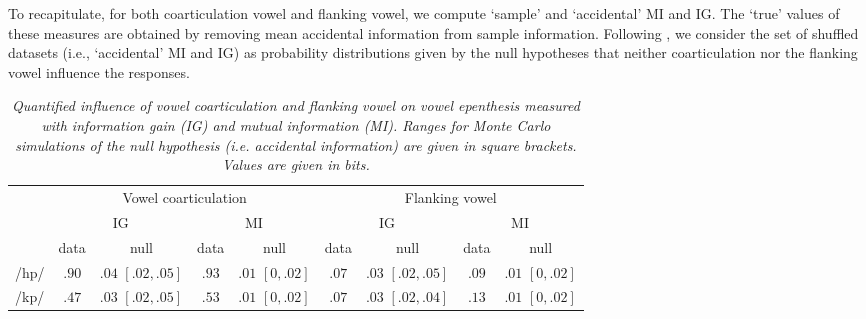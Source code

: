 To recapitulate, for both coarticulation vowel and flanking vowel, we compute `sample' and `accidental' MI and IG. The `true' values of these measures are obtained by removing mean accidental information from sample information. Following \cite{daland2015}, we consider the set of shuffled datasets (i.e., `accidental' MI and IG) as probability distributions given by the null hypotheses that neither coarticulation nor the flanking vowel influence the responses. 

\begin{table}[h!]
\setlength{\tabcolsep}{2pt}
\centering
    \begin{threeparttable}
    \caption{\textit{Quantified influence of vowel coarticulation and flanking vowel on vowel epenthesis measured with information gain (IG) and mutual information (MI). Ranges for Monte Carlo simulations of the null hypothesis (i.e. accidental information) are given in square brackets. Values are given in bits.}} 
    
    \label{infoth}
    \begin{tabular}{lcccccccc}
        \toprule
             & \multicolumn{4}{c}{Vowel coarticulation} & \multicolumn{4}{c}{Flanking vowel} \\ [0.5ex]
             & \multicolumn{2}{c}{IG} & \multicolumn{2}{c}{MI} & \multicolumn{2}{c}{IG} & \multicolumn{2}{c}{MI} \\ \cmidrule(lr){2-3}\cmidrule(lr){4-5} \cmidrule(lr){6-7}\cmidrule(lr){8-9}   
             & data & null & data & null &  data & null &  data & null  \\
        \midrule
             /hp/ & \textbf{$.90$} & $.04$ $[.02,.05]$  & \textbf{$.93$} & $.01$ $[0,.02]$& \textbf{$.07$} & $.03$ $[.02,.05]$ & \textbf{$.09$} & $.01$  $[0,.02]$  \\  %
             /kp/ & \textbf{$.47$} & $.03$  $[.02,.05]$ & \textbf{$.53$} & $.01$ $[0,.02]$& \textbf{$.07$} & $.03$ $[.02,.04]$& \textbf{$.13$} & $.01$ $[0,.02]$  \\
    \bottomrule
    \end{tabular}
  \end{threeparttable}
\end{table}

